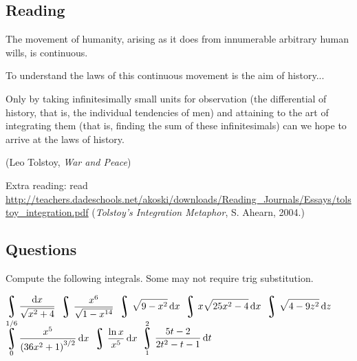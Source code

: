 


\subsection*{Reading}
The movement of humanity, arising as it does from innumerable
arbitrary human wills, is continuous.

To understand the laws of this continuous movement is the aim
of history...

Only by taking infinitesimally small units for observation (the
differential of history, that is, the individual tendencies of men) and
attaining to the art of integrating them (that is, finding the sum of
these infinitesimals) can we hope to arrive at the laws of history.

(Leo Tolstoy, \textit{War and Peace})

Extra reading: read \small{\url{http://teachers.dadeschools.net/akoski/downloads/Reading_Journals/Essays/tolstoy_integration.pdf}}
(\textit{Tolstoy's Integration Metaphor}, S. Ahearn, 2004.)

\subsection*{Questions}
Compute the following integrals. Some may not require trig substitution.
\begin{questions}
  \question $ \displaystyle\displaystyle\rint \frac{\dif{x}}{\sqrt{x^2 + 4}} $
  \question $ \displaystyle\displaystyle\rint \frac{x^6}{\sqrt{1 - x^{14}}} $
  \question $ \displaystyle\displaystyle\rint \sqrt{9 - x^2} \dif{x} $
  \question $ \displaystyle\displaystyle\rint x \sqrt{25x^2 - 4} \dif{x} $
  \question $ \displaystyle\displaystyle\rint \sqrt{4-9z^2} \dif{z} $
  \question $ \displaystyle\displaystyle\rint^{1/6}_0 \frac{x^5}{\left( 36x^2 + 1 \right)^{3/2}} \dif{x} $
  \question $ \displaystyle\displaystyle\rint \frac{\ln x}{x^5} \dif{x} $
  \question $ \displaystyle\displaystyle\rint^2_1 \frac{5t - 2}{2t^2 - t - 1} \dif{t} $
\end{questions}


